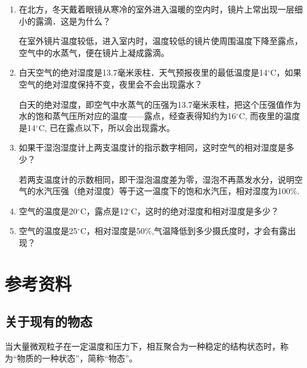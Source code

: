 \begin{enumerate}
	\item 在北方，冬天戴着眼镜从寒冷的室外进入温暖的空内时，镜片上常出现一层细小的露滴．这是为什么？
    
  \begin{solution}
在室外镜片温度较低，进入室内时，温度较低的镜片使周围温度下降至露点，空气中的水蒸气，便在镜片上凝成露滴。
  \end{solution}
\item 白天空气的绝对湿度是13.7毫米汞柱．天气预报夜里的最低温度是14$^\circ$C，如果空气的绝对湿度保持不变，夜里会不会出现露水？
    
\begin{solution}
  白天的绝对湿度，即空气中水蒸气的压强为13.7毫米汞柱，把这个压强值作为水的饱和蒸气压所对应的温度——露点，经查表得知约为16$^\circ$C, 而夜里的温度是14$^\circ$C, 已在露点以下，所以会出现露水。
\end{solution}
\item 如果干湿泡湿度计上两支温度计的指示数字相同，这时空气的相对湿度是多少？
    
\begin{solution}
若两支温度计的示数相同，即干湿泡温度差为零，湿泡不再蒸发水分，说明空气的水汽压强（绝对湿度）等于这一温度下的饱和水汽压，相对湿度为100\%.
\end{solution}
\item 空气的温度是20$^\circ$C，露点是12$^\circ$C，这时的绝对湿度和相对湿度是多少？
    
\begin{solution}
  
\end{solution}
\item 空气的温度是25$^\circ$C，相对湿度是50\%,气温降低到多少摄氏度时，才会有露出现？
    
\begin{solution}
  
\end{solution}
\end{enumerate}

\section{参考资料}
\subsection{关于现有的物态}

当大量微观粒子在一定温度和压力下，相互聚合为一种稳定的结构状态时，称为“物质的一种状态”，简称“物态”。

